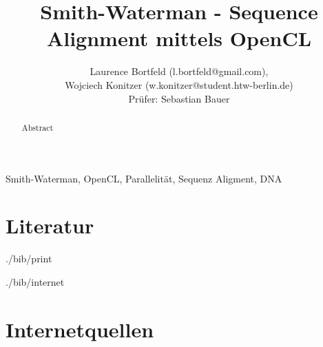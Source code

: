 \documentclass[journal]{IEEEtran}
\begin{document}
\title{Smith-Waterman - Sequence Alignment mittels OpenCL}
\author{
  Laurence Bortfeld (l.bortfeld@gmail.com), \\
  Wojciech Konitzer (w.konitzer@student.htw-berlin.de) \\
  Prüfer: Sebastian Bauer
}

\maketitle

\begin{abstract}
Abstract
\end{abstract}

\begin{IEEEkeywords}
Smith-Waterman, OpenCL, Parallelität, Sequenz Aligment, DNA
\end{IEEEkeywords}



\section*{Literatur}

\begin{btSect}{./bib/print}
\btPrintCited
\end{btSect}

\begin{btSect}{./bib/internet}
\section*{Internetquellen}
\btPrintCited
\end{btSect}
\end{document}
